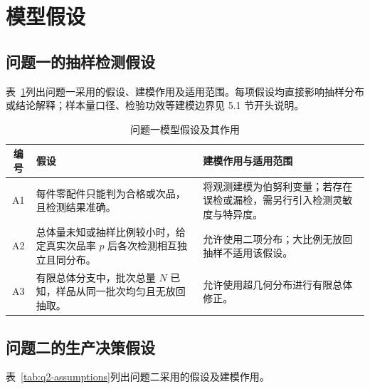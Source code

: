 \section{模型假设}

\subsection{问题一的抽样检测假设}

表~\ref{tab:q1-assumptions}列出问题一采用的假设、建模作用及适用范围。每项假设均直接影响抽样分布或结论解释；样本量口径、检验功效等建模边界见 5.1 节开头说明。

\begin{table}[H]
  \centering
  \caption{问题一模型假设及其作用}
  \label{tab:q1-assumptions}
  \begin{tabularx}{\textwidth}{c>{\raggedright\arraybackslash}p{}>{\raggedright\arraybackslash}X}
    \toprule
    编号 & 假设 & 建模作用与适用范围 \\
    \midrule
    A1 & 每件零配件只能判为合格或次品，且检测结果准确。 & 将观测建模为伯努利变量；若存在误检或漏检，需另行引入检测灵敏度与特异度。 \\
    A2 & 总体量未知或抽样比例较小时，给定真实次品率 $p$ 后各次检测相互独立且同分布。 & 允许使用二项分布；大比例无放回抽样不适用该假设。 \\
    A3 & 有限总体分支中，批次总量 $N$ 已知，样品从同一批次均匀且无放回抽取。 & 允许使用超几何分布进行有限总体修正。 \\
    \bottomrule
  \end{tabularx}
\end{table}

\subsection{问题二的生产决策假设}

表~\ref{tab:q2-assumptions}列出问题二采用的假设及建模作用。

